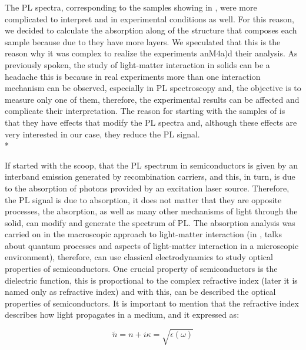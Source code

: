 The PL spectra, corresponding to the samples showing in ,  were more complicated to interpret and in experimental conditions as well. For this reason, we decided to calculate the absorption along of the structure that composes each sample because due to they have more layers. We speculated that this is the reason why it was complex to realize the experiments anM4a)d their analysis. As previously spoken, the study of light-matter interaction in solids can be a headache this is because in real experiments more than one interaction mechanism can be observed, especially in PL spectroscopy and, the objective is to measure only one of them, therefore, the experimental results can be affected and complicate their interpretation. The reason for starting with the samples of  is that they have effects that modify the PL spectra and, although these effects are very interested in our case, they reduce the PL signal.\\* 


If started with the scoop, that the PL spectrum in semiconductors is given by an interband emission generated by recombination carriers, and this, in turn, is due to the absorption of photons provided by an excitation laser source. Therefore, the PL signal is due to absorption, it does not matter that they are opposite processes, the absorption, as well as many other mechanisms of light through the solid, can modify and generate the spectrum of PL. The absorption analysis was carried on in the macroscopic approach to light-matter interaction (in , talks about quantum processes and aspects of light-matter interaction in a microscopic environment), therefore,   can use classical electrodynamics to study optical properties of semiconductors. One crucial property of semiconductors is the dielectric function, this is proportional to the complex refractive index (later it is named only as refractive index) and with this,  can be described the optical properties of semiconductors. It is important to mention that the refractive index describes how light propagates  in a medium, and it expressed as\cite{chuang1995physics,jimenez2016spectroscopic}:

\begin{equation}
	\tilde{n}=n + i\kappa = \sqrt{\epsilon(\omega)}
	\label{eq:chapter-3-PL-complex-refractive-index}
\end{equation}

